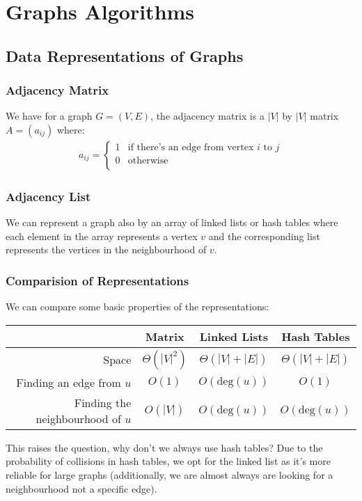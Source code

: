 \section{Graphs Algorithms}

\subsection{Data Representations of Graphs}

\subsubsection{Adjacency Matrix}

We have for a graph $G = (V, E)$, the adjacency matrix is a
$|V|$ by $|V|$ matrix $A = (a_{ij})$ where: \begin{gather*}
  a_{ij} = \begin{cases}
    1 & \text{if there's an edge from vertex $i$ to $j$} \\
    0 & \text{otherwise} \\
  \end{cases}
\end{gather*}

\subsubsection{Adjacency List}

We can represent a graph also by an array of linked lists or 
hash tables where
each element in the array represents a vertex $v$ and the corresponding
list represents the vertices in the neighbourhood of $v$.

\subsubsection{Comparision of Representations}

We can compare some basic properties of the representations:
\begin{center}
  \renewcommand{\arraystretch}{1.4}
  \begin{tabular}{ | r || c | c | c |}
    \hline
    & Matrix & Linked Lists & Hash Tables \\ 
    \hline\hline
    Space & $\Theta(|V|^2)$ & $\Theta(|V| + |E|)$ & $\Theta(|V| + |E|)$ \\
    Finding an edge from $u$ & $O(1)$ & $O(\text{deg}(u))$ & $O(1)$ \\
    Finding the neighbourhood of $u$ & $O(|V|)$ & $O(\text{deg}(u))$ & $O(\text{deg}(u))$ \\
    \hline
  \end{tabular}
\end{center} This raises the question, why don't we always use
hash tables? Due to the probability of collisions in hash tables,
we opt for the linked list as it's more reliable for large graphs
(additionally, we are almost always are looking for a neighbourhood
not a specific edge).

